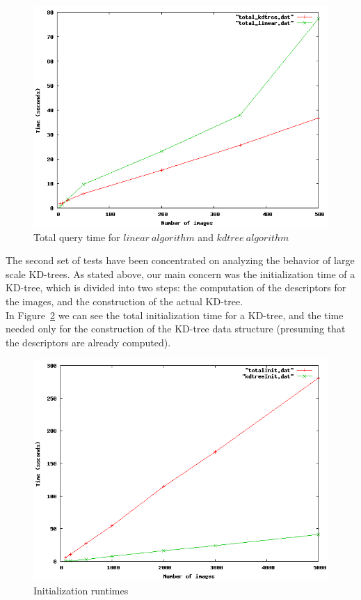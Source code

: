 \begin{figure}[ht!]
\centering
\includegraphics[width=.7\linewidth]{images/totalRuntimes.png}
\caption{Total query time for $linear\ algorithm$ and $kdtree\ algorithm$}
\label{fig:totalRuntimes}
\end{figure}

The second set of tests have been concentrated on analyzing the behavior of large scale KD-trees.
As stated above, our main concern was the initialization time of a KD-tree, which is divided into two steps: the computation of the descriptors for the images, and the construction of the actual KD-tree.\\
In Figure~\ref{fig:totalInit} we can see the total initialization time for a KD-tree, and the time needed only for the construction of the KD-tree data structure (presuming that the descriptors are already computed). \\
\begin{figure}[ht!]
\centering
\includegraphics[width=.8\linewidth]{images/totalInit.png}
\caption{Initialization runtimes}
\label{fig:totalInit}
\end{figure}

